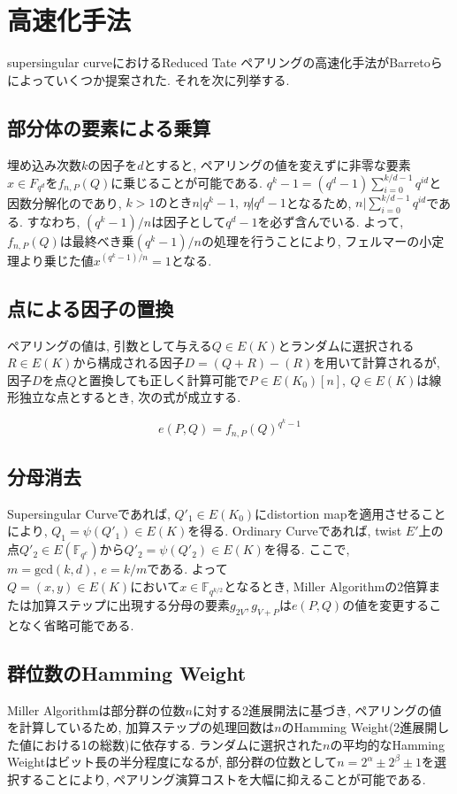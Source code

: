 \section{高速化手法}
supersingular curveにおけるReduced Tate ペアリングの高速化手法がBarretoらによっていくつか提案された\cite{BKLS01}. それを次に列挙する. 
\subsection{部分体の要素による乗算}
埋め込み次数$k$の因子を$d$とすると, ペアリングの値を変えずに非零な要素$x \in {F}_{q^d}をf_{n,P}(Q)$に乗じることが可能である. $q^k - 1 = (q^d - 1)\sum^{k / d - 1}_{i = 0} q^{id}$と因数分解化のであり, $k > 1のときn | q^k -  1,\ n \not | q^d - 1$となるため, $n | \sum^{k / d - 1}_{i = 0} q^{id}$である. すなわち, $(q^k - 1) / n は因子としてq^d - 1$を必ず含んでいる. よって, $f_{n,P}(Q)は最終べき乗(q^k - 1) / n$の処理を行うことにより, フェルマーの小定理より乗じた値$x^{(q^k - 1) / n} = 1$となる. 
\subsection{点による因子の置換}
ペアリングの値は, 引数として与える$Q \in E(K)$とランダムに選択される$R \in E(K)$から構成される因子$D = (Q + R) - (R)$を用いて計算されるが, 因子$Dを点Q$と置換しても正しく計算可能で$P \in E(K_0)[n],\ Q \in E(K)$は線形独立な点とするとき, 次の式が成立する. 
\par
\[
e(P,Q) = f_{n,P}(Q)^{q^k-1}
\]
\subsection{分母消去}
Supersingular Curveであれば, $Q'_1 \in E(K_0)$にdistortion mapを適用させることにより, $Q_1 = \psi (Q'_1) \in E(K)$を得る. Ordinary Curveであれば, twist $E'$上の点$Q'_2 \in E(\mathbb{F}_{q^e})からQ'_2 = \psi (Q'_2) \in E(K)を得る$. ここで, $m = \mbox{gcd}(k,d),\ e = k/m$である. よって$Q = (x,y) \in E(K)においてx \in \mathbb{F}_{q^{k/2}} となるとき$, Miller Algorithmの2倍算または加算ステップに出現する分母の要素$g_{2V},g_{V + P}はe(P,Q)$の値を変更することなく省略可能である. 
\subsection{群位数のHamming Weight}
Miller Algorithmは部分群の位数$n$に対する2進展開法に基づき, ペアリングの値を計算しているため, 加算ステップの処理回数は$n$のHamming Weight(2進展開した値における1の総数)に依存する. ランダムに選択された$n$の平均的なHamming Weightはビット長の半分程度になるが, 部分群の位数として$n = 2^\alpha \pm 2^\beta \pm 1$を選択することにより, ペアリング演算コストを大幅に抑えることが可能である. 
